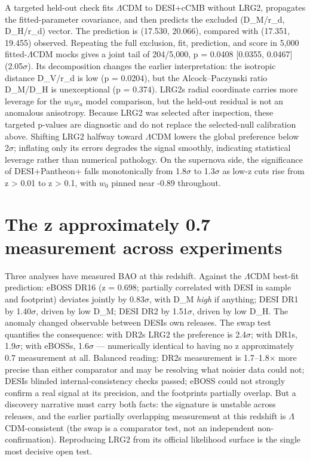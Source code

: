 \documentclass[aps,prd,preprint,superscriptaddress,nofootinbib]{revtex4-2}
\begin{document}
A targeted held-out check fits \(\Lambda\)CDM to DESI+cCMB without LRG2,
propagates the fitted-parameter covariance, and then predicts the
excluded (D\_M/r\_d, D\_H/r\_d) vector. The prediction is (17.530,
20.066), compared with (17.351, 19.455) observed. Repeating the full
exclusion, fit, prediction, and score in 5,000 fitted-\(\Lambda\)CDM
mocks gives a joint tail of 204/5,000, p = 0.0408 {[}0.0355, 0.0467{]}
(2.05\(\sigma\)). Its decomposition changes the earlier interpretation:
the isotropic distance D\_V/r\_d is low (p = 0.0204), but the
Alcock--Paczynski ratio D\_M/D\_H is unexceptional (p = 0.374).
LRG2\textquotesingle s radial coordinate carries more leverage for the
\(w_0\)\(w_a\) model comparison, but the held-out residual is not an
anomalous anisotropy. Because LRG2 was selected after inspection, these
targeted p-values are diagnostic and do not replace the selected-null
calibration above. Shifting LRG2 halfway toward \(\Lambda\)CDM lowers
the global preference below 2\(\sigma\); inflating only its errors
degrades the signal smoothly, indicating statistical leverage rather
than numerical pathology. On the supernova side, the significance of
DESI+Pantheon+ falls monotonically from 1.8\(\sigma\) to 1.3\(\sigma\)
as low-z cuts rise from z \textgreater{} 0.01 to z \textgreater{} 0.1,
with \(w_0\) pinned near -0.89 throughout.

\section{The z approximately 0.7 measurement across
experiments}\label{the-z-approximately-07-measurement-across-experiments}

Three analyses have measured BAO at this redshift. Against the
\(\Lambda\)CDM best-fit prediction: eBOSS DR16 (z = 0.698; partially
correlated with DESI in sample and footprint) deviates jointly by
0.83\(\sigma\), with D\_M \emph{high} if anything; DESI DR1 by
1.40\(\sigma\), driven by low D\_M; DESI DR2 by 1.51\(\sigma\), driven
by low D\_H. The anomaly changed observable between
DESI\textquotesingle s own releases. The swap test quantifies the
consequence: with DR2\textquotesingle s LRG2 the preference is
2.4\(\sigma\); with DR1\textquotesingle s, 1.9\(\sigma\); with
eBOSS\textquotesingle s, 1.6\(\sigma\) --- numerically identical to
having no z approximately 0.7 measurement at all. Balanced reading:
DR2\textquotesingle s measurement is 1.7--1.8\(\times\) more precise
than either comparator and may be resolving what noisier data could not;
DESI\textquotesingle s blinded internal-consistency checks passed; eBOSS
could not strongly confirm a real signal at its precision, and the
footprints partially overlap. But a discovery narrative must carry both
facts: the signature is unstable across releases, and the earlier
partially overlapping measurement at this redshift is
\(\Lambda\)CDM-consistent (the swap is a comparator test, not an
independent non-confirmation). Reproducing LRG2 from its official
likelihood surface is the single most decisive open test.
\end{document}
